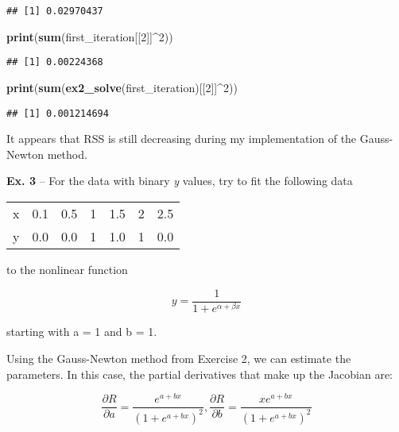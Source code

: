 \documentclass[
]{article}
\newenvironment{Shaded}{\begin{snugshade}}{\end{snugshade}}
\newcommand{\DecValTok}[1]{\textcolor[rgb]{0.00,0.00,0.81}{#1}}
\newcommand{\KeywordTok}[1]{\textcolor[rgb]{0.13,0.29,0.53}{\textbf{#1}}}
\newcommand{\NormalTok}[1]{#1}
\newcommand{\OperatorTok}[1]{\textcolor[rgb]{0.81,0.36,0.00}{\textbf{#1}}}
\begin{document}
\begin{verbatim}
## [1] 0.02970437
\end{verbatim}

\begin{Shaded}
\begin{Highlighting}[]
\KeywordTok{print}\NormalTok{(}\KeywordTok{sum}\NormalTok{(first\_iteration[[}\DecValTok{2}\NormalTok{]]}\OperatorTok{\^{}}\DecValTok{2}\NormalTok{))}
\end{Highlighting}
\end{Shaded}

\begin{verbatim}
## [1] 0.00224368
\end{verbatim}

\begin{Shaded}
\begin{Highlighting}[]
\KeywordTok{print}\NormalTok{(}\KeywordTok{sum}\NormalTok{(}\KeywordTok{ex2\_solve}\NormalTok{(first\_iteration)[[}\DecValTok{2}\NormalTok{]]}\OperatorTok{\^{}}\DecValTok{2}\NormalTok{))}
\end{Highlighting}
\end{Shaded}

\begin{verbatim}
## [1] 0.001214694
\end{verbatim}

It appears that RSS is still decreasing during my implementation of the
Gauss-Newton method.

\textbf{Ex. 3} -- For the data with binary \emph{y} values, try to fit
the following data

\begin{longtable}[]{@{}lrrrrrr@{}}
\toprule
\endhead
x & 0.1 & 0.5 & 1 & 1.5 & 2 & 2.5\tabularnewline
y & 0.0 & 0.0 & 1 & 1.0 & 1 & 0.0\tabularnewline
\bottomrule
\end{longtable}

to the nonlinear function

\[ y = \frac{1}{1 + e^{ \alpha + \beta x}}\]

starting with a = 1 and b = 1.

Using the Gauss-Newton method from Exercise 2, we can estimate the
parameters. In this case, the partial derivatives that make up the
Jacobian are:

\[\frac{\partial R}{\partial a} = \frac{e^{a+bx}}{(1 + e^{a + bx})^2}, \frac{\partial R}{\partial b} = \frac{xe^{a+bx}}{(1 + e^{a + bx})^2}\]
\end{document}
